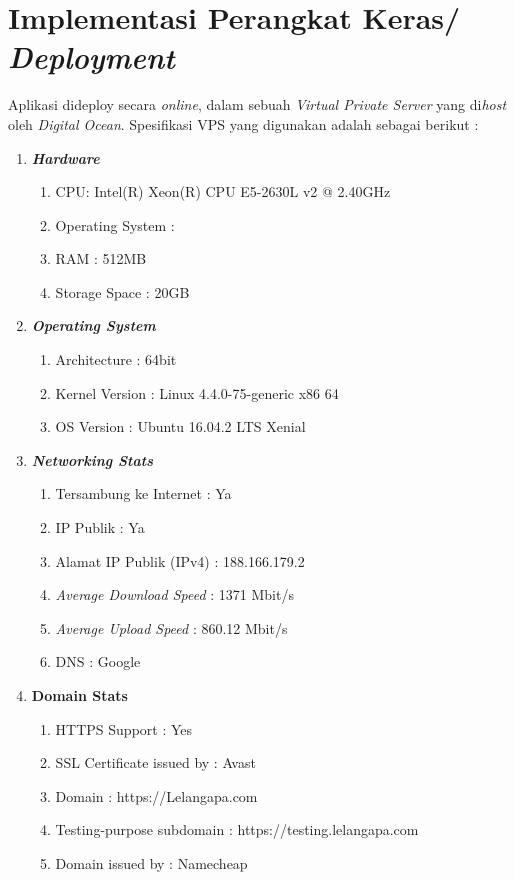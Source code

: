   \section{Implementasi Perangkat Keras/ \textit{Deployment}}
  
  Aplikasi dideploy secara \textit{online}, dalam sebuah \textit{Virtual Private Server} yang di\textit{host} oleh \textit{Digital Ocean}.
  Spesifikasi VPS yang digunakan adalah sebagai berikut :
  
  \begin{enumerate}
  	\item \textbf{\textit{Hardware}}
  	\begin{enumerate}
  		\item CPU: Intel(R) Xeon(R) CPU E5-2630L v2 @ 2.40GHz
  		\item Operating System : 
  		\item RAM : 512MB
  		\item Storage Space : 20GB
  	\end{enumerate}
  	
  	\item \textbf{\textit{Operating System}}
  	\begin{enumerate}
  		\item Architecture : 64bit
  		\item Kernel Version : Linux 4.4.0-75-generic x86 64
  		\item OS Version : Ubuntu 16.04.2 LTS Xenial
  	\end{enumerate}
  	
  	\item \textit{\textbf{Networking Stats}}
  	\begin{enumerate}
  		\item Tersambung ke Internet : Ya
  		\item IP Publik : Ya
  		\item Alamat IP Publik (IPv4) : 188.166.179.2
  		\item \textit{Average Download Speed} : 1371 Mbit/s
  		\item \textit{Average Upload Speed} : 860.12 Mbit/s
  		\item DNS : Google
  	\end{enumerate}
  	
  	\item \textbf{\textbf{Domain Stats}}
  	\begin{enumerate}
  		\item HTTPS Support : Yes
  		\item SSL Certificate issued by : Avast
  		\item Domain : https://Lelangapa.com
  		\item Testing-purpose subdomain : https://testing.lelangapa.com
  		\item Domain issued by : Namecheap
  	\end{enumerate}
  	
  \end{enumerate}
  
